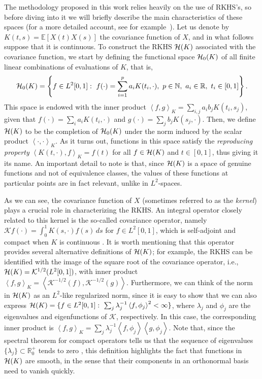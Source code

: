 \documentclass[ba]{imsart}
\numberwithin{equation}{section}
\theoremstyle{plain}
\newcommand{\N}{\mathbb{N}}
\newcommand{\R}{\mathbb{R}}
\newcommand{\Hcal}{\ensuremath\mathcal{H}}
\newcommand\dotprod[2]{\left\langle #1, #2 \right\rangle}
\begin{document}
The methodology proposed in this work relies heavily on the use of RKHS's, so before diving into it we will briefly describe the main characteristics of these spaces (for a more detailed account, see for example~\citet{berlinet2004reproducing}). Let us denote by \(K(t, s)= \mathbb E[X(t)X(s)]\) the covariance function of \(X\), and in what follows suppose that it is continuous. To construct the RKHS \(\Hcal(K)\) associated with the covariance function, we start by defining the functional space \(\Hcal_0(K)\) of all finite linear combinations of evaluations of \(K\), that is,
\begin{equation}\label{eq:h0}
\Hcal_0(K) = \left\{ f \in L^2[0,1]: \ f(\cdot) = \sum_{i=1}^p a_i K(t_i, \cdot), \ p \in \N, \ a_i \in \R, \ t_i \in [0, 1] \right\}.
\end{equation}
This space is endowed with the inner product \(\dotprod{f}{g}_K = \sum_{i, j} a_i b_j K(t_i, s_j)\), given that \(f(\cdot)=\sum_i a_i K(t_i, \cdot) \) and \(g(\cdot)=\sum_j b_j K(s_j, \cdot)\). Then, we define \(\Hcal(K)\) to be the completion of \(\Hcal_0(K)\) under the norm induced by the scalar product \(\dotprod{\cdot}{\cdot}_K\). As it turns out, functions in this space satisfy the \textit{reproducing property} \(\dotprod{K(t, \cdot)}{f}_K = f(t)\) for all \(f \in \Hcal(K)\) and \(t \in [0, 1]\), thus giving it its name. An important detail to note is that, since \(\Hcal(K)\) is a space of genuine functions and not of equivalence classes, the values of these functions at particular points are in fact relevant, unlike in \(L^2\)-spaces.

As we can see, the covariance function of \(X\) (sometimes referred to as the \textit{kernel}) plays a crucial role in characterizing the RKHS. An integral operator closely related to this kernel is the so-called covariance operator, namely \(\mathcal Kf(\cdot) = \int_0^1 K(s, \cdot)f(s)\, ds\) for \(f \in L^2[0, 1]\), which is self-adjoint and compact when \(K\) is continuous \citep[e.g.][Th.~4.6.2]{hsing2015theoretical}. It is worth mentioning that this operator provides several alternative definitions of \(\Hcal(K)\); for example, the RKHS can be identified with the image of the square root of the covariance operator, i.e., \(\Hcal(K) = \mathcal K^{1/2}(L^2[0, 1])\), with inner product \(\dotprod{f}{g}_K = \dotprod{\mathcal K^{-1/2}(f)}{\mathcal K^{-1/2}(g)}\). Furthermore, we can think of the norm in \(\Hcal(K)\) as an \(L^2\)-like regularized norm, since it is easy to show that we can also express \(\Hcal(K) = \{f \in L^2[0, 1]: \ \sum_j \lambda_j^{-1}\dotprod{f}{\phi_j}^2 < \infty \}\), where \(\lambda_j\) and \(\phi_j\) are the eigenvalues and eigenfunctions of \(\mathcal K\), respectively. In this case, the corresponding inner product is \(\dotprod{f}{g}_K = \sum_j \lambda_j^{-1}\dotprod{f}{\phi_j}\dotprod{g}{\phi_j}\). Note that, since the spectral theorem for compact operators tells us that the sequence of eigenvalues \(\{\lambda_j\}\subset \R^+_0\) tends to zero \citep[e.g.][Th.~4.2.4]{hsing2015theoretical}, this definition highlights the fact that functions in \(\Hcal(K)\) are smooth, in the sense that their components in an orthonormal basis need to vanish quickly.
\end{document}
